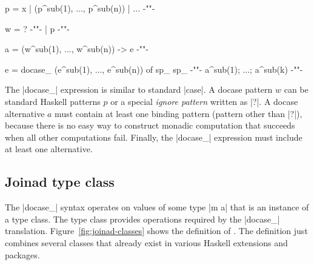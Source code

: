 \documentclass{sigplanconf}
\begin{document}
\begin{code}
p  =  x | (p^sub(1), ..., p^sub(n)) | ...            {-""-}

w  =  ?                                              {-""-}
   |  p                                              {-""-}

a  =  (w^sub(1), ..., w^sub(n)) -> e                 {-""-}

e  =  docase_ (e^sub(1), ..., e^sub(n)) of  sp_ sp_  {-""-}
        a^sub(1); ...; a^sub(k)                      {-""-}
\end{code}
The |docase_| expression is similar to standard |case|. A docase pattern $w$ can be standard Haskell 
patterns $p$ or a special \textit{ignore pattern} written as |?|. A docase alternative $a$ must
contain at least one binding pattern (pattern other than |?|), because there is no easy way to 
construct monadic computation that succeeds when all other computations fail. Finally, the |docase_| 
expression must include at least one alternative.


\subsection{Joinad type class}
\label{sec:extension-typeclass}

The |docase_| syntax operates on values of some type |m a| that is an instance of a  
type class. The type class provides operations required by the |docase_| translation. 
Figure~\ref{fig:joinad-classes} shows the definition of . The definition just 
combines several classes that already exist in various Haskell extensions and packages. 
\end{document}
